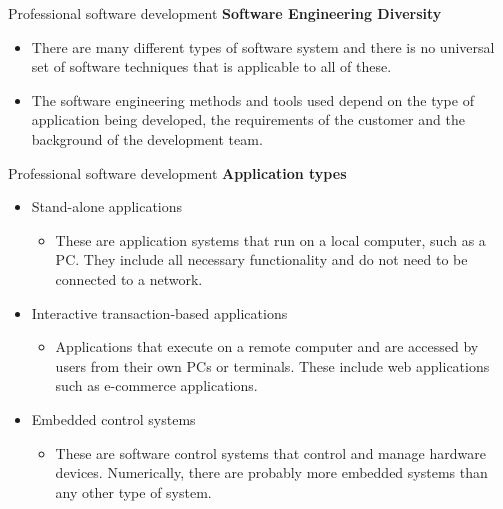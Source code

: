 \documentclass{beamer}
\begin{document}
\begin{frame}{{Professional software development}}
\textbf{Software Engineering Diversity}
\begin{itemize}
	\item There are many different types of software system and there is no universal set of software techniques that is applicable to all of these.

	\item The software engineering methods and tools used depend on the type of application 
	being developed, the requirements of the customer and the background of the 
	development team.
\end{itemize}
\end{frame}
\begin{frame}{{Professional software development}}
	\textbf{Application types}
	\begin{itemize}
		\item Stand-alone applications 
		\begin{itemize}
			\item These are application systems that run on a local computer, such as a PC. They include all necessary functionality and do not need to be connected to a 
			network.
		\end{itemize}
	\item Interactive transaction-based applications
	\begin{itemize}
		\item Applications that execute on a remote computer and are accessed by users from 
		their own PCs or terminals. These include web applications such as e-commerce 
		applications. 
	\end{itemize}
\item Embedded control systems
\begin{itemize}
	\item These are software control systems that control and manage hardware devices. 
	Numerically, there are probably more embedded systems than any other type of 
	system.

\end{itemize}
	\end{itemize}
\end{frame}
\end{document}
